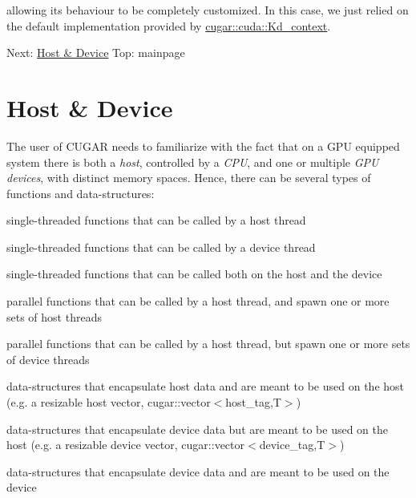 \begin{DoxyParagraph}{}
allowing its behaviour to be completely customized. In this case, we just relied on the default implementation provided by \hyperlink{structcugar_1_1cuda_1_1_kd__context}{cugar\+::cuda\+::\+Kd\+\_\+context}.
\end{DoxyParagraph}
Next\+: \hyperlink{host_device_page}{Host \& Device} Top\+: mainpage \hypertarget{host_device_page}{}\section{Host \& Device}\label{host_device_page}
\begin{DoxyParagraph}{}
The user of C\+U\+G\+AR needs to familiarize with the fact that on a G\+PU equipped system there is both a {\itshape host}, controlled by a {\itshape C\+PU}, and one or multiple {\itshape G\+PU} {\itshape devices}, with distinct memory spaces. Hence, there can be several types of functions and data-\/structures\+: 
\end{DoxyParagraph}
\begin{DoxyParagraph}{}

\begin{DoxyItemize}
\item single-\/threaded functions that can be called by a host thread
\item single-\/threaded functions that can be called by a device thread
\item single-\/threaded functions that can be called both on the host and the device
\item parallel functions that can be called by a host thread, and spawn one or more sets of host threads
\item parallel functions that can be called by a host thread, but spawn one or more sets of device threads 
\end{DoxyItemize}
\end{DoxyParagraph}
\begin{DoxyParagraph}{}

\begin{DoxyItemize}
\item data-\/structures that encapsulate host data and are meant to be used on the host (e.\+g. a resizable host vector, cugar\+::vector$<$host\+\_\+tag,\+T$>$)
\item data-\/structures that encapsulate device data but are meant to be used on the host (e.\+g. a resizable device vector, cugar\+::vector$<$device\+\_\+tag,\+T$>$)
\item data-\/structures that encapsulate device data and are meant to be used on the device 
\end{DoxyItemize}
\end{DoxyParagraph}
